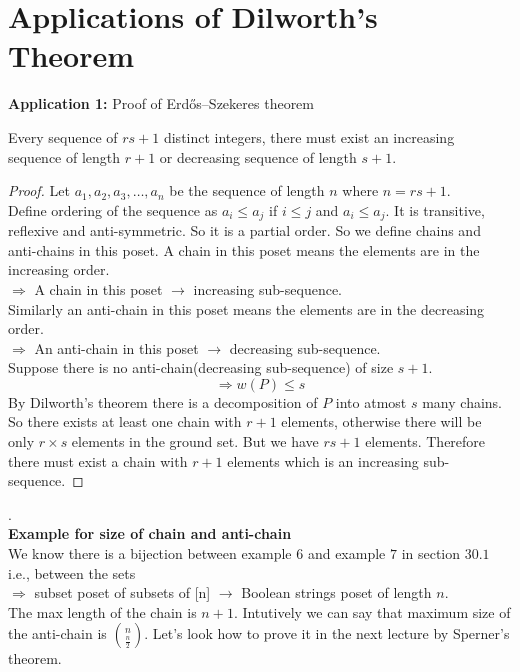 \section{Applications of Dilworth's Theorem}
\textbf{Application 1:} Proof of Erdős–Szekeres theorem\\
\begin{theorem}
Every sequence of $rs+1$ distinct integers, there must exist an increasing sequence of length $r+1$ or decreasing sequence of length $s+1$.
\begin{proof}
Let $a_1,a_2,a_3,\ldots,a_n$ be the sequence of length $n$ where $n = rs+1$.\\
Define ordering of the sequence as $a_i \leq a_j$ if $i\leq j$ and $a_i \leq a_j$. It is transitive, reflexive and anti-symmetric. So it is a partial order. So we define chains and anti-chains in this poset. A chain in this poset means the elements are in the increasing order.\\
$\Rightarrow$ A chain in this poset $\rightarrow$ increasing sub-sequence.\\
Similarly an anti-chain in this poset means the elements are in the decreasing order.\\
$\Rightarrow$ An anti-chain in this poset $\rightarrow$ decreasing sub-sequence.\\
Suppose there is no anti-chain(decreasing sub-sequence) of size $s+1$.
$$\Rightarrow w(P) \leq s$$
By Dilworth's theorem there is a decomposition of $P$ into atmost $s$ many chains. So there exists at least one chain with $r+1$ elements, otherwise there will be only $r\times s$ elements in the ground set. But we have $rs+1$ elements. Therefore there must exist a chain with $r+1$ elements which is an increasing sub-sequence.
\end{proof}
\end{theorem}
.\\
\textbf{Example for size of chain and anti-chain}\\
We know there is a bijection between example $6$ and example $7$ in section $30.1$ i.e., between the sets\\
$\Rightarrow$ subset poset of subsets of [n] $\rightarrow$ Boolean strings poset of length $n$.\\
The max length of the chain is $n+1$. Intutively we can say that maximum size of the anti-chain is $n \choose \frac{n}{2}$. Let's look how to prove it in the next lecture by Sperner's theorem.
